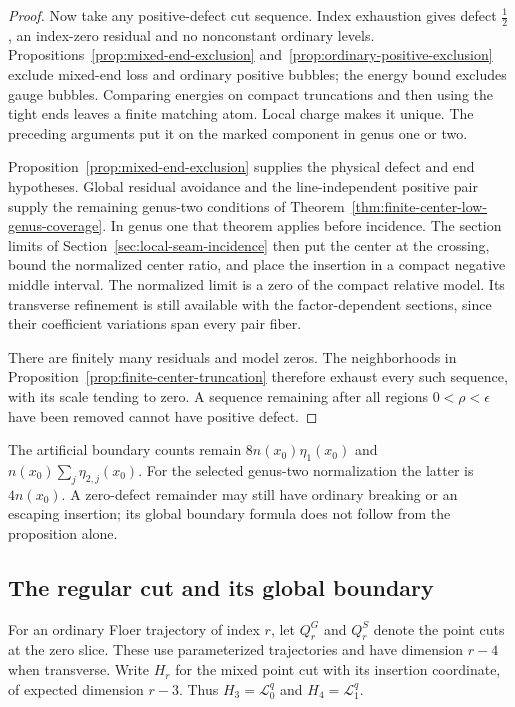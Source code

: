 \documentclass[11pt]{amsart}
\theoremstyle{definition}
\theoremstyle{remark}
\theoremstyle{plain}
\newcommand{\cL}{\mathcal{L}}
\begin{document}
\begin{proof}
Now take any positive-defect cut sequence.
Index exhaustion gives defect $\frac12$,
an index-zero residual and no nonconstant
ordinary levels.
Propositions~\ref{prop:mixed-end-exclusion}
and~\ref{prop:ordinary-positive-exclusion}
exclude mixed-end loss and ordinary
positive bubbles; the energy bound
excludes gauge bubbles. Comparing energies
on compact truncations and then using
the tight ends leaves a finite matching
atom. Local charge makes it unique.
The preceding arguments put it on the
marked component in genus one or two.

Proposition~\ref{prop:mixed-end-exclusion}
supplies the physical defect and end
hypotheses. Global residual avoidance
and the line-independent positive pair
supply the remaining genus-two conditions
of Theorem~\ref{thm:finite-center-low-genus-coverage}.
In genus one that theorem applies
before incidence. The section limits
of Section~\ref{sec:local-seam-incidence}
then put the center at the crossing,
bound the normalized center ratio,
and place the insertion in a compact
negative middle interval. The normalized
limit is a zero of the compact relative
model. Its transverse refinement is
still available with the factor-dependent
sections, since their coefficient
variations span every pair fiber.

There are finitely many residuals and
model zeros. The neighborhoods in
Proposition~\ref{prop:finite-center-truncation}
therefore exhaust every such sequence,
with its scale tending to zero.
A sequence remaining after all regions
$0<\rho<\epsilon$ have been removed
cannot have positive defect.
\end{proof}

The artificial boundary counts remain
$8n(x_0)\eta_1(x_0)$ and
$n(x_0)\sum_j\eta_{2,j}(x_0)$.
For the selected genus-two normalization
the latter is $4n(x_0)$.
A zero-defect remainder may still have
ordinary breaking or an escaping insertion;
its global boundary formula does not
follow from the proposition alone.

\subsection{The regular cut and its global boundary}
\label{sec:fixed-point-global-boundary}

For an ordinary Floer trajectory of index $r$, let
$Q_r^G$ and $Q_r^S$ denote the point cuts at the
zero slice. These use parameterized trajectories
and have dimension $r-4$ when transverse.
Write $H_r$ for the mixed point cut with its
insertion coordinate, of expected dimension $r-3$.
Thus $H_3=\cL_0^q$ and $H_4=\cL_1^q$.
\end{document}
